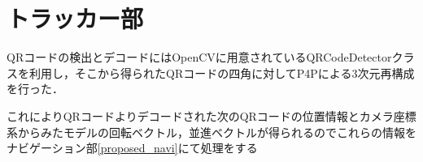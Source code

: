 \section{トラッカー部}
\label{proposed_tracker}
QRコードの検出とデコードにはOpenCVに用意されているQRCodeDetectorクラスを利用し，そこから得られたQRコードの四角に対してP4Pによる3次元再構成を行った．

これによりQRコードよりデコードされた次のQRコードの位置情報とカメラ座標系からみたモデルの回転ベクトル，並進ベクトルが得られるのでこれらの情報をナビゲーション部\ref{proposed_navi}にて処理をする
